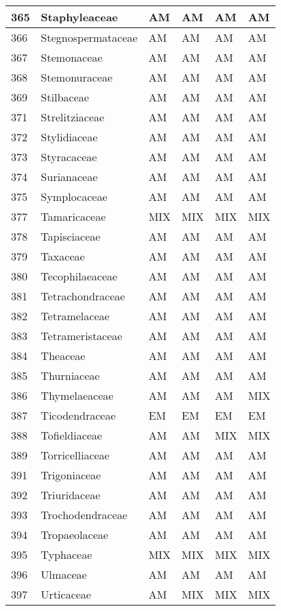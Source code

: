 \documentclass[]{article}
\begin{document}
\begin{longtable}{l|l|l|l|l|l}
\hline
365 & Staphyleaceae & AM & AM & AM & AM\\
\hline
366 & Stegnospermataceae & AM & AM & AM & AM\\
\hline
367 & Stemonaceae & AM & AM & AM & AM\\
\hline
368 & Stemonuraceae & AM & AM & AM & AM\\
\hline
369 & Stilbaceae & AM & AM & AM & AM\\
\hline
371 & Strelitziaceae & AM & AM & AM & AM\\
\hline
372 & Stylidiaceae & AM & AM & AM & AM\\
\hline
373 & Styracaceae & AM & AM & AM & AM\\
\hline
374 & Surianaceae & AM & AM & AM & AM\\
\hline
375 & Symplocaceae & AM & AM & AM & AM\\
\hline
377 & Tamaricaceae & MIX & MIX & MIX & MIX\\
\hline
378 & Tapisciaceae & AM & AM & AM & AM\\
\hline
379 & Taxaceae & AM & AM & AM & AM\\
\hline
380 & Tecophilaeaceae & AM & AM & AM & AM\\
\hline
381 & Tetrachondraceae & AM & AM & AM & AM\\
\hline
382 & Tetramelaceae & AM & AM & AM & AM\\
\hline
383 & Tetrameristaceae & AM & AM & AM & AM\\
\hline
384 & Theaceae & AM & AM & AM & AM\\
\hline
385 & Thurniaceae & AM & AM & AM & AM\\
\hline
386 & Thymelaeaceae & AM & AM & AM & MIX\\
\hline
387 & Ticodendraceae & EM & EM & EM & EM\\
\hline
388 & Tofieldiaceae & AM & AM & MIX & MIX\\
\hline
389 & Torricelliaceae & AM & AM & AM & AM\\
\hline
391 & Trigoniaceae & AM & AM & AM & AM\\
\hline
392 & Triuridaceae & AM & AM & AM & AM\\
\hline
393 & Trochodendraceae & AM & AM & AM & AM\\
\hline
394 & Tropaeolaceae & AM & AM & AM & AM\\
\hline
395 & Typhaceae & MIX & MIX & MIX & MIX\\
\hline
396 & Ulmaceae & AM & AM & AM & AM\\
\hline
397 & Urticaceae & AM & MIX & MIX & MIX\\

\end{longtable}
\end{document}
